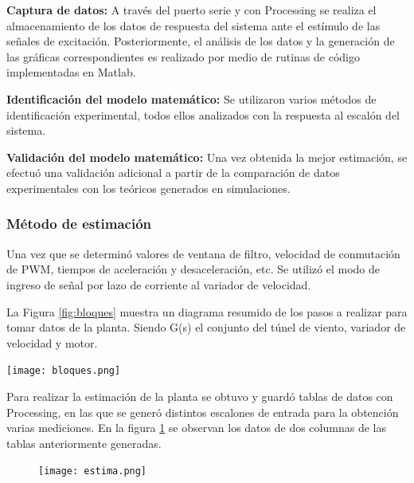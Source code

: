  \textbf{Captura de datos:} A través del puerto serie y con Processing se realiza el almacenamiento de los datos de respuesta del sistema ante el estímulo de las señales de excitación. Posteriormente, el análisis de los datos y la generación de las gráficas correspondientes es realizado por medio de rutinas de código implementadas en Matlab.

 \textbf{Identificación del modelo matemático:} Se utilizaron varios métodos de identificación experimental, todos ellos analizados con la respuesta al escalón del sistema.

 \textbf{Validación del modelo matemático:} Una vez obtenida la mejor estimación, se efectuó una validación adicional a partir de la comparación de datos experimentales con los teóricos generados en simulaciones.






    \subsubsection{Método de estimación}

    Una vez que se determinó valores de ventana de filtro, velocidad de conmutación de PWM, tiempos de aceleración y desaceleración, etc. Se utilizó el modo de ingreso de señal por lazo de corriente al variador de velocidad. 
    
    La Figura \ref{fig:bloques} muestra un diagrama resumido de los pasos a realizar para tomar datos de la planta. Siendo G(s) el conjunto del túnel de viento, variador de velocidad y motor.
 
    \begin{center}
    	\texttt{[image: bloques.png]}
    	\label{fig:bloques}    
    \end{center}
    
    Para realizar la estimación de la planta se obtuvo y guardó tablas de datos con Processing, en las que se generó distintos escalones de entrada para la obtención varias mediciones. En la figura \ref{fig:est2} se observan los datos de dos columnas de las tablas anteriormente generadas.
    
    \begin{figure}[htb]
    	\centering
    	\texttt{[image: estima.png]} %
    	\label{fig:est2}    
    \end{figure}
    
